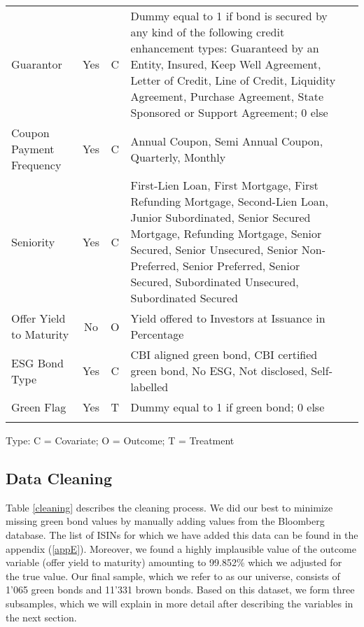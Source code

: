 \begin{table}[!h]
\begin{adjustbox}{width=\columnwidth,center}
\begin{tabular}{@{\extracolsep{5pt}}lccp{10cm}p{3cm}}
Guarantor & Yes & C &  Dummy equal to 1 if bond is secured by any kind of the following credit enhancement types: Guaranteed by an Entity, Insured, Keep Well Agreement, Letter of Credit, Line of Credit, Liquidity Agreement, Purchase Agreement, State Sponsored or Support Agreement; 0 else\\
Coupon Payment Frequency & Yes & C & Annual Coupon, Semi Annual Coupon, Quarterly, Monthly \\
Seniority & Yes & C & First-Lien Loan, First Mortgage, First Refunding Mortgage, Second-Lien Loan, Junior Subordinated, Senior Secured Mortgage, Refunding Mortgage, Senior Secured, Senior Unsecured, Senior Non-Preferred, Senior Preferred, Senior Secured, Subordinated Unsecured, Subordinated Secured\\
Offer Yield to Maturity & No & O & Yield offered to Investors at Issuance in Percentage \\
ESG Bond Type & Yes & C & CBI aligned green bond, CBI certified green bond, No ESG, Not disclosed, Self-labelled\\
Green Flag & Yes & T & Dummy equal to 1 if green bond; 0 else\\
\hline \\[-1.8ex] 
\end{tabular} 
\end{adjustbox}
\vspace{1ex}

     {\raggedright Type: C = Covariate; O = Outcome; T = Treatment \par}
\end{table}
\subsection{Data Cleaning}
Table \ref{cleaning} describes the cleaning process. We did our best to minimize missing green bond values by manually adding values from the Bloomberg database. The list of ISINs for which we have added this data can be found in the appendix (\ref{appE}). Moreover, we found a highly implausible value of the outcome variable (offer yield to maturity) amounting to 99.852\% which we adjusted for the true value. Our final sample, which we refer to as our universe, consists of 1'065 green bonds and 11'331 brown bonds. Based on this dataset, we form three subsamples, which we will explain in more detail after describing the variables in the next section.

